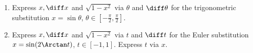 \begin{enumerate}[ref={\fcProblemRef}]
\item \label{problemTheoreticalTrigSubx=sint} Express $x, \diff x $ and $\sqrt{1-x^2 }$ via $\theta$ and $\diff \theta$ for the trigonometric substitution $x=\sin \theta $, $\theta\in \left[-\frac{\pi}{2}, \frac{\pi}{2}\right]$.
\item \label{problemTheoreticalTrigSubx=sin(2arctant)} Express $x, \diff x $ and $\sqrt{1-x^2}$ via $t$ and $\diff t$ for the Euler substitution $x=\sin(2\Arctan t)$, $t\in[-1,1]$. Express $t$ via $x$.
\end{enumerate}

